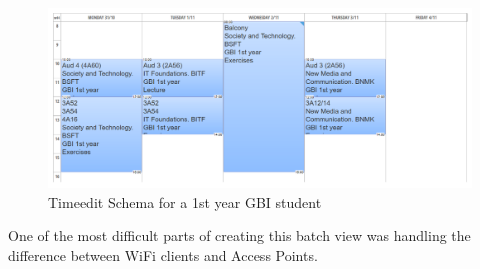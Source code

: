 \begin{figure}[H]
	\centering
	\includegraphics[width=\linewidth]{figures/schema-from-timeedit.png}
	\caption{Timeedit Schema for a 1st year GBI student}
	\label{fig:timeedit_schema}
\end{figure}

One of the most difficult parts of creating this batch view was handling the difference between WiFi clients and Access Points. 
